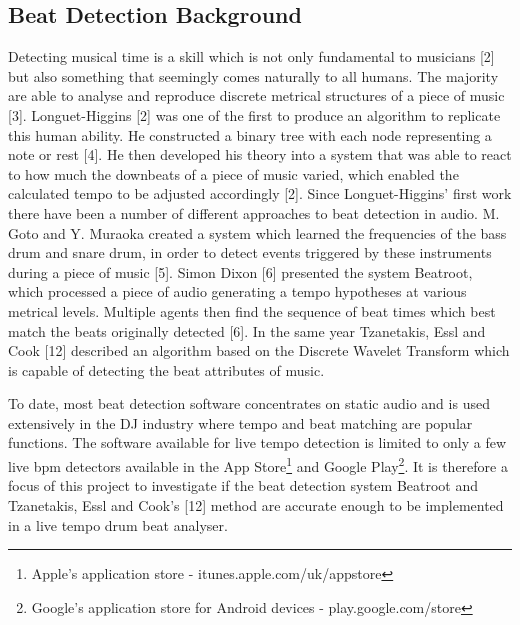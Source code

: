 \documentclass[a4paper, 11pt]{article}
\begin{document}
\subsection{Beat Detection Background}

Detecting musical time is a skill which is not only fundamental to musicians [2] but also something that seemingly comes naturally to all humans. The majority are able to analyse and reproduce discrete metrical structures of a piece of music [3]. Longuet-Higgins [2] was one of the first to produce an algorithm to replicate this human ability. He constructed a binary tree with each node representing a note or rest [4]. He then developed his theory into a system that was able to react to how much the downbeats of a piece of music varied, which enabled the calculated tempo to be adjusted accordingly [2]. Since Longuet-Higgins' first work there have been a number of different approaches to beat detection in audio. M. Goto and Y. Muraoka created a system which learned the frequencies of the bass drum and snare drum, in order to detect events triggered by these instruments during a piece of music [5]. Simon Dixon [6] presented the system Beatroot, which processed a piece of audio generating a tempo hypotheses at various metrical levels. Multiple agents then find the sequence of beat times which best match the beats originally detected [6]. In the same year Tzanetakis, Essl and Cook [12] described an algorithm based on the Discrete Wavelet Transform which is capable of detecting the beat attributes of music. 

To date, most beat detection software concentrates on static audio and is used extensively in the DJ industry where tempo and beat matching are popular functions. The software available for live tempo detection is limited to only a few live bpm detectors available in the App Store\footnote{Apple's application store - itunes.apple.com/uk/appstore‎} and Google Play\footnote{Google's application store for Android devices - play.google.com/store}. It is therefore a focus of this project to investigate if the beat detection system Beatroot and Tzanetakis, Essl and Cook's [12] method are accurate enough to be implemented in a live tempo drum beat analyser.
\end{document}
